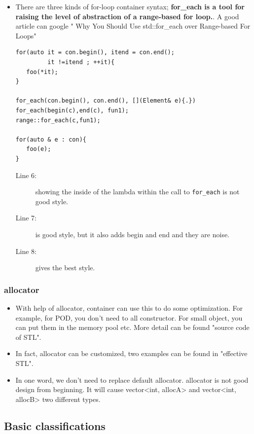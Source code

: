 \documentclass[a4paper,11pt,twoside]{book}
\begin{document}
\begin{itemize}
\item There are three kinds of for-loop container syntax; \textbf{for\_each is a tool for raising the level of abstraction of a range-based for loop.}. A good article can google " Why You Should Use std::for\_each over Range-based For Loops"
\begin{lstlisting}
for(auto it = con.begin(), itend = con.end();
         it !=itend ; ++it){
   foo(*it);
}

for_each(con.begin(), con.end(), [](Element& e){.})
for_each(begin(c),end(c), fun1);
range::for_each(c,fun1);

for(auto & e : con){
   foo(e);
}
\end{lstlisting}
\begin{description}
\item[Line 6:] showing the inside of the lambda within the call to \texttt{for\_each} is not good style.
\item[Line 7:] is good style, but it also adds begin and end and they are noise. 
\item[Line 8:] gives the best style.
\end{description}


\end{itemize}
\subsubsection{allocator}
\begin{itemize}
	\item With help of allocator, container can use this to do some optimization. For example, for POD, you don't need to all constructor. For small object, you can put them in the memory pool etc.  More detail can be found "source code of STL". 
	
	\item In fact, allocator can be customized, two examples can be found in "effective STL". 
	
	\item In one word, we don't need to replace default allocator. allocator is not good design from beginning. It will cause vector<int, allocA> and vector<int, allocB> two different types. 
\end{itemize}


\subsection{Basic classifications}
\end{document}
